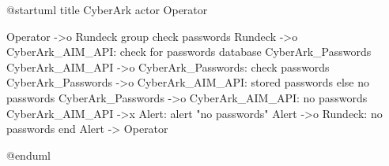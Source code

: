 @startuml
title CyberArk
actor Operator

Operator ->o Rundeck
group check passwords
  Rundeck ->o CyberArk_AIM_API: check for passwords
  database CyberArk_Passwords
  CyberArk_AIM_API ->o CyberArk_Passwords: check passwords
  CyberArk_Passwords ->o CyberArk_AIM_API: stored passwords
else no passwords
  CyberArk_Passwords ->o CyberArk_AIM_API: no passwords
  CyberArk_AIM_API ->x Alert: alert "no passwords"
  Alert ->o Rundeck: no passwords
end
Alert -> Operator


@enduml
